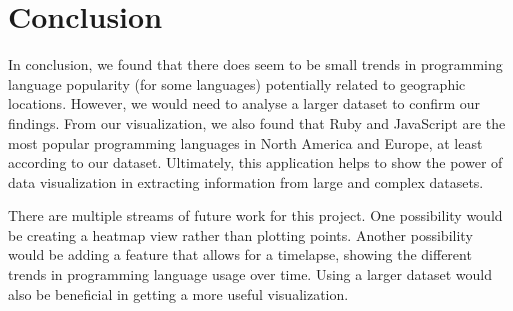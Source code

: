 \documentclass[11pt]{article}
\begin{document}
\section{Conclusion}
In conclusion, we found that there does seem to be small trends in programming language popularity (for some languages) potentially related to geographic locations. However, we would need to analyse a larger dataset to confirm our findings. From our visualization, we also found that Ruby and JavaScript are the most popular programming languages in North America and Europe, at least according to our dataset. Ultimately, this application helps to show the power of data visualization in extracting information from large and complex datasets.

There are multiple streams of future work for this project. One possibility would be creating a heatmap view rather than plotting points. Another possibility would be adding a feature that allows for a timelapse, showing the different trends in programming language usage over time. Using a larger dataset would also be beneficial in getting a more useful visualization.

%
%
\end{document}
